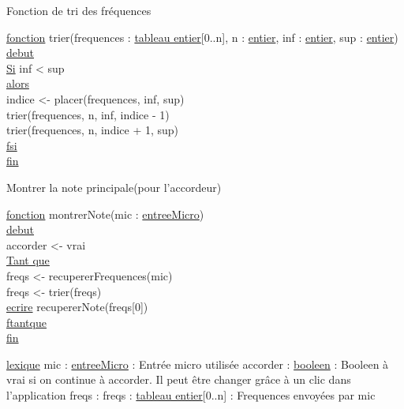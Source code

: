 Fonction de tri des fréquences\newline
\begin{tabbing}
\ul{fonction} trier(frequences : \ul{tableau entier}[0..n], n : \ul{entier}, inf : \ul{entier}, sup : \ul{entier})\\
\ul{debut}\\
    \ul{Si} inf < sup\\
    \ul{alors}\\
        indice <- placer(frequences, inf, sup)\\
        trier(frequences, n, inf, indice - 1)\\
        trier(frequences, n, indice + 1, sup)\\
    \ul{fsi}\\
\ul{fin}\\ 
\end{tabbing}

Montrer la note principale(pour l'accordeur)\newline
\begin{tabbing}
\ul{fonction} montrerNote(mic : \ul{entreeMicro})\\
\ul{debut}\\
accorder <- vrai\\
\ul{Tant que}\\
freqs <- recupererFrequences(mic)\\
freqs <- trier(freqs)\\
\ul{ecrire} recupererNote(freqs[0])\\
\ul{ftantque}\\
\ul{fin}\\
\end{tabbing}

\ul{lexique}\newline
mic : \ul{entreeMicro} : Entrée micro utilisée\newline
accorder : \ul{booleen} : Booleen à vrai si on continue à accorder. Il peut être changer grâce à un clic dans l'application\newline
freqs : freqs : \ul{tableau entier}[0..n] : Frequences envoyées par mic\newline
\newline

